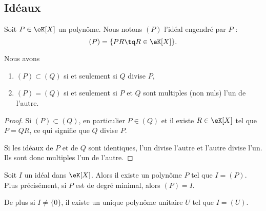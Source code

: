 \subsection{Idéaux}

Soit \( P\in \eK[X]\) un polynôme. Nous notons \( (P)\) l'idéal engendré par \( P\) :
\begin{equation}        \label{EqDefxMkDtW}
    (P)=\{ PR\tq R\in\eK[X] \}.
\end{equation}

\begin{lemma}
    Nous avons
    \begin{enumerate}
        \item
            \( (P)\subset (Q)\) si et seulement si \( Q\) divise \( P\),
        \item
            \( (P)=(Q)\) si et seulement si \( P\) et \( Q\) sont multiples (non nuls) l'un de l'autre.
    \end{enumerate}
\end{lemma}

\begin{proof}
    Si \( (P)\subset (Q)\), en particulier \( P\in(Q)\) et il existe \( R\in\eK[X]\) tel que \( P=QR\), ce qui signifie que \( Q\) divise \( P\).

    Si les idéaux de \( P\) et de \( Q\) sont identiques, l'un divise l'autre et l'autre divise l'un. Ils sont donc multiples l'un de l'autre.
\end{proof}

\begin{theorem}     \label{ThoCCHkoU}
    Soit \( I\) un idéal dans \( \eK[X]\). Alors il existe un polynôme \( P\) tel que \( I=(P)\). Plus précisément, si \( P\) est de degré minimal, alors \( (P)=I\).

    De plus si \( I\neq \{  0\}\), il existe un unique polynôme unitaire \( U\) tel que \( I=(U)\).
\end{theorem}

